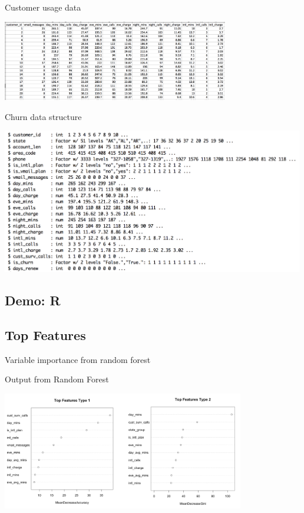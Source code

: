 \documentclass[10pt]{beamer}
\begin{document}
    \begin{frame}{Customer usage data}
        \begin{center}
          \includegraphics[height=100pt]{../graphs/dataset_customer_usage}
        \end{center}
    \end{frame}

    \begin{frame}{Churn data structure}
      \begin{center}
        \includegraphics[height=180pt]{../graphs/dataset_churn_str}
      \end{center}
    \end{frame}

  \subsection{Demo: R}

  \subsection{Top Features}
  
    \begin{frame}{Variable importance from random forest}
      \begin{block}{Output from Random Forest}
        \begin{center}
          \includegraphics[width=300pt]{../graphs/rf_var_importance_2}
        \end{center}
      \end{block}
    \end{frame}
\end{document}
